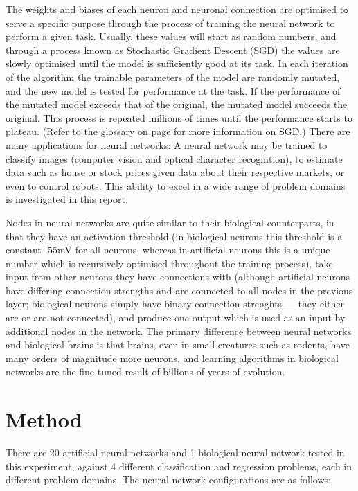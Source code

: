 \documentclass[]{report}
\begin{document}
The weights and biases of each neuron and neuronal connection are optimised to serve a specific purpose through the process of training the neural network to perform a given task. Usually, these values will start as random numbers, and through a process known as Stochastic Gradient Descent (SGD) the values are slowly optimised until the model is sufficiently good at its task. In each iteration of the algorithm the trainable parameters of the model are randomly mutated, and the new model is tested for performance at the task. If the performance of the mutated model exceeds that of the original, the mutated model succeeds the original. This process is repeated millions of times until the performance starts to plateau. (Refer to the glossary on page \pageref{itm:SGD} for more information on SGD.) There are many applications for neural networks: A neural network may be trained to classify images (computer vision and optical character recognition), to estimate data such as house or stock prices given data about their respective markets, or even to control robots. This ability to excel in a wide range of problem domains is investigated in this report.

Nodes in neural networks are quite similar to their biological counterparts, in that they have an activation threshold (in biological neurons this threshold is a constant -55mV for all neurons, whereas in artificial neurons this is a unique number which is recursively optimised throughout the training process), take input from other neurons they have connections with (although artificial neurons have differing connection strengths and are connected to all nodes in the previous layer; biological neurons simply have binary connection strenghts --- they either are or are not connected), and produce one output which is used as an input by additional nodes in the network. The primary difference between neural networks and biological brains is that brains, even in small creatures such as rodents, have many orders of magnitude more neurons, and learning algorithms in biological networks are the fine-tuned result of billions of years of evolution.

\label{itm:Method}
\section{Method}

There are 20 artificial neural networks and 1 biological neural network tested in this experiment, against 4 different classification and regression problems, each in different problem domains. The neural network configurations are as follows:
\end{document}

